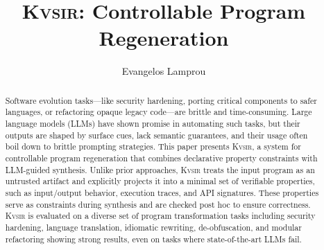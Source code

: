 \documentclass[sigplan,review,anonymous,10pt]{acmart}
\newcommand{\sys}{{\scshape Kv{\textalpha}sir}\xspace}
\begin{document}
\title{\sys: Controllable Program Regeneration}
\author{Evangelos Lamprou}



\begin{abstract}
  Software evolution tasks---like security hardening, porting critical components to safer 
  languages, or refactoring opaque legacy code---are brittle and time-consuming.
  Large language models (LLMs) have shown promise in automating such tasks,
  but their outputs are shaped by surface cues, lack
  semantic guarantees, and their usage often boil down to brittle prompting strategies.
This paper presents \sys, a system for controllable program regeneration that
  combines declarative property constraints with LLM-guided synthesis. Unlike
  prior approaches, \sys treats the input program as an untrusted artifact and
  explicitly projects it into a minimal set of verifiable properties, such as
  input/output behavior, execution traces, and API signatures. These properties
  serve as constraints during synthesis and are checked post hoc to ensure
  correctness.
\sys is evaluated on a diverse set of program transformation tasks
including security hardening, language translation, idiomatic rewriting, de-obfuscation,
and modular refactoring showing strong results, even on tasks where state-of-the-art LLMs fail.
\end{abstract}

\end{document}
